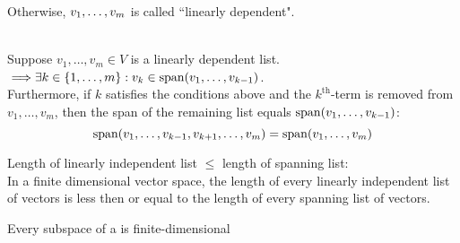 \begin{mydef}
  Otherwise, $v_1, \dots, v_m$ is called ``linearly dependent".
\end{mydef}




\setcounter{thm}{18}
\begin{thm}
  \label{linear-dependence-lemma}
   \\
  Suppose $v_{1}, \dots, v_{m}\in V$ is a linearly dependent list.
  ${ \color{black}{\implies}} \exists k \in \{ 1, \dots, m \} : v_k \in \operatorname{span} (v_1, \dots, v_{k-1})$. \\
  Furthermore, if $k$ satisfies the conditions above and the $k^{\text{th}}$-term is removed from $v_1, \dots, v_m$, then the span of the remaining list equals $\operatorname{span} (v_1, \dots, v_{k-1})$:
  \begin{equation}
    \operatorname{span} (v_1, \dots, v_{k-1}, v_{k+1}, \dots, v_m) = \operatorname{span} (v_1, \dots, v_m)
  \end{equation}
\end{thm}

\setcounter{thm}{21}

\begin{thm}
  \label{length-of-linearly-dependent-list-less-or-equal-length-of-spanning-list}
  Length of linearly independent list $\mathbb{\leq}$ length of spanning list:\\
  In a finite dimensional vector space, the length of every linearly independent list of vectors is less then or equal to the length of every spanning list of vectors.
\end{thm}

\setcounter{thm}{24}
\begin{thm}
  Every subspace of a \findimvs is finite-dimensional
\end{thm}
